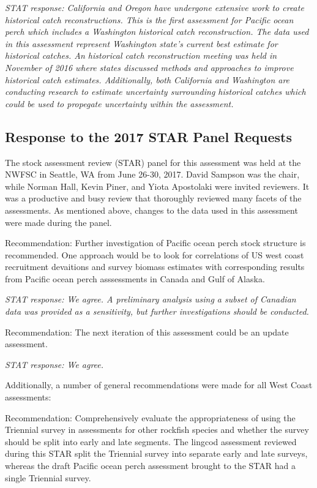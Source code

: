 \documentclass[12pt,]{article}
\begin{document}
\emph{STAT response: California and Oregon have undergone extensive work
to create historical catch reconstructions. This is the first assessment
for Pacific ocean perch which includes a Washington historical catch
reconstruction. The data used in this assessment represent Washington
state's current best estimate for historical catches. An historical
catch reconstruction meeting was held in November of 2016 where states
discussed methods and approaches to improve historical catch estimates.
Additionally, both California and Washington are conducting research to
estimate uncertainty surrounding historical catches which could be used
to propegate uncertainty within the assessment.}

\subsection{Response to the 2017 STAR Panel
Requests}\label{response-to-the-2017-star-panel-requests}

The stock assessment review (STAR) panel for this assessment was held at
the NWFSC in Seattle, WA from June 26-30, 2017. David Sampson was the
chair, while Norman Hall, Kevin Piner, and Yiota Apostolaki were invited
reviewers. It was a productive and busy review that thoroughly reviewed
many facets of the assessments. As mentioned above, changes to the data
used in this assessment were made during the panel.

Recommendation: Further investigation of Pacific ocean perch stock
structure is recommended. One approach would be to look for correlations
of US west coast recruitment devaitions and survey biomass estimates
with corresponding results from Pacific ocean perch asssessments in
Canada and Gulf of Alaska.

\emph{STAT response: We agree. A preliminary analysis using a subset of
Canadian data was provided as a sensitivity, but further investigations
should be conducted.}

Recommendation: The next iteration of this assessment could be an update
assessment.

\emph{STAT response: We agree.}

Additionally, a number of general recommendations were made for all West
Coast assessments:

Recommendation: Comprehensively evaluate the appropriateness of using
the Triennial survey in assessments for other rockfish species and
whether the survey should be split into early and late segments. The
lingcod assessment reviewed during this STAR split the Triennial survey
into separate early and late surveys, whereas the draft Pacific ocean
perch assessment brought to the STAR had a single Triennial survey.
\end{document}
